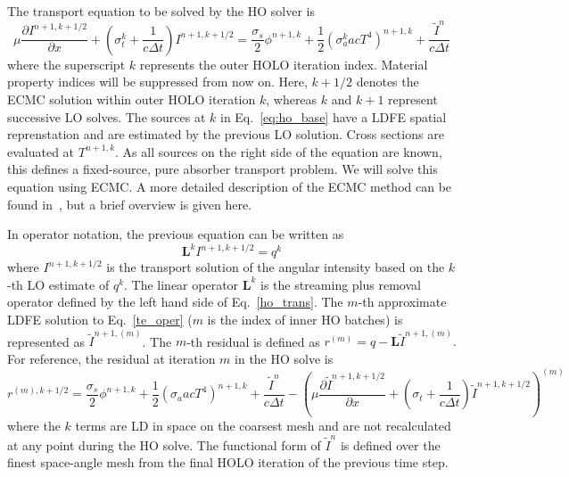 \documentclass{mc2013}
\newcommand{\pderiv}[2]{\frac{\partial #1}{\partial #2}}
\newcommand{\B}[1]{\ensuremath{\mathbf{#1}}}
\begin{document}

The transport equation to be solved by the HO solver is
\begin{equation}\label{eq:ho_base}
\mu \pderiv{I^{n+1,k+1/2}}{x} + \left(\sigma_t^k + \frac{1}{c \Delta t }\right)
I^{n+1,k+1/2}
= \frac{\sigma_s}{2} \phi^{n+1,k} +\frac{1}{2} \left(\sigma_a^k a c T^4
\right)^{n+1,k} + \frac{\tilde I^n}{c\Delta t} 
\end{equation}
where the superscript $k$ represents the outer HOLO iteration index.  Material property indices will be
suppressed from now on.  Here, $k+1/2$ denotes the
ECMC solution within outer HOLO iteration $k$, whereas $k$ and $k+1$ represent successive LO
solves. The sources at $k$ in Eq.~\eqref{eq:ho_base} have a LDFE spatial reprenstation and are estimated by the previous LO solution. Cross sections are
evaluated at $T^{n+1,k}$.  As all sources on the right side of the equation are known,
this defines a fixed-source, pure absorber transport problem.  We will solve
this equation using ECMC.  A more detailed description of the
ECMC method can be found in~\cite{jake_thesis}, but a brief overview is given here.

 In operator notation, the previous equation can be written as
\begin{equation}\label{te_oper}
\B L^k I^{n+1,k+1/2}  = q^{k}
\end{equation}
where $I^{n+1,k+1/2}$ is the transport solution of the angular intensity based on the
$k$-th LO estimate of $q^k$.
The linear operator $\B L^k$ is the streaming plus
removal operator defined by the left hand
side of Eq.~\eqref{ho_trans}.
The $m$-th approximate LDFE solution to Eq.~\eqref{te_oper} ($m$ is the index of inner HO
batches) is represented as
$\tilde{I}^{n+1,(m)}$.    
The $m$-th residual is defined as $r^{(m)} = q - \B L\tilde{I}^{n+1,(m)}.$ 
For reference, the residual at iteration $m$ in the HO solve
is
\begin{equation}\label{eq:resid}
r^{(m),k+1/2} = \frac{\sigma_s}{2} \phi^{n+1,k} +\frac{1}{2} \left(\sigma_a a c T^4
\right)^{n+1,k} + \frac{\tilde{I}^n}{c \Delta t } -
\left(\mu \pderiv{\tilde{I}^{n+1,k+1/2}}{x} +
\left(\sigma_t + \frac{1}{c \Delta t }\right) \tilde{I}^{n+1,k+1/2}\right)^{(m)}
\end{equation}
where the $k$ terms are LD in space on the coarsest mesh and are not recalculated at any point during
the HO solve.  The functional form of $\tilde{I}^n$ is defined over the finest
space-angle mesh from the final HOLO iteration of the previous time step.  
\end{document}
